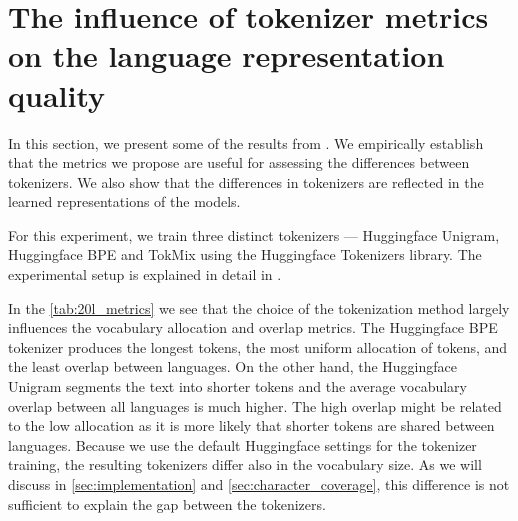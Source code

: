 \section{The influence of tokenizer metrics on the language representation quality}
\label{sec:influence_of_metrics}

In this section, we present some of the results from \citet{limisiewicz_tokenization_2023}. We empirically establish that the metrics we propose are useful for assessing the differences between tokenizers. We also show that the differences in tokenizers are reflected in the learned representations of the models. 

For this experiment, we train three distinct tokenizers --- Huggingface Unigram, Huggingface BPE and TokMix using the Huggingface Tokenizers library. The experimental setup is explained in detail in .



In the \autoref{tab:20l_metrics} we see that the choice of the tokenization method largely influences the vocabulary allocation and overlap metrics. The Huggingface BPE tokenizer produces the longest tokens, the most uniform allocation of tokens, and the least overlap between languages. On the other hand, the Huggingface Unigram segments the text into shorter tokens and the average vocabulary overlap between all languages is much higher. The high overlap might be related to the low allocation as it is more likely that shorter tokens are shared between languages. Because we use the default Huggingface settings for the tokenizer training, the resulting tokenizers differ also in the vocabulary size. As we will discuss in \autoref{sec:implementation} and \autoref{sec:character_coverage}, this difference is not sufficient to explain the gap between the tokenizers. %


